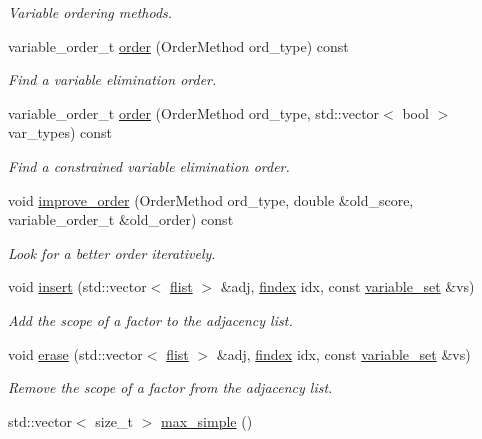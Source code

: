\begin{DoxyCompactItemize}
\begin{DoxyCompactList}\small\item\em Variable ordering methods. \end{DoxyCompactList}\item 
variable\+\_\+order\+\_\+t \hyperlink{classmerlin_1_1graphical__model_a90bcf3fb02f0f43bf57520e834875c78}{order} (Order\+Method ord\+\_\+type) const 
\begin{DoxyCompactList}\small\item\em Find a variable elimination order. \end{DoxyCompactList}\item 
variable\+\_\+order\+\_\+t \hyperlink{classmerlin_1_1graphical__model_a8a722099188b11d7e44b668c13e836f2}{order} (Order\+Method ord\+\_\+type, std\+::vector$<$ bool $>$ var\+\_\+types) const 
\begin{DoxyCompactList}\small\item\em Find a constrained variable elimination order. \end{DoxyCompactList}\item 
void \hyperlink{classmerlin_1_1graphical__model_a42f9b6f295100feefaaec09cef03c173}{improve\+\_\+order} (Order\+Method ord\+\_\+type, double \&old\+\_\+score, variable\+\_\+order\+\_\+t \&old\+\_\+order) const 
\begin{DoxyCompactList}\small\item\em Look for a better order iteratively. \end{DoxyCompactList}\item 
void \hyperlink{classmerlin_1_1graphical__model_aa953b05dcb91b18c8726324bcbe7eb24}{insert} (std\+::vector$<$ \hyperlink{classmerlin_1_1graphical__model_a615e25ec6594615fddfd4c3c4776b99f}{flist} $>$ \&adj, \hyperlink{classmerlin_1_1graphical__model_ab2b46f09d8142bb68f243ecadbdabb6b}{findex} idx, const \hyperlink{classmerlin_1_1variable__set}{variable\+\_\+set} \&vs)
\begin{DoxyCompactList}\small\item\em Add the scope of a factor to the adjacency list. \end{DoxyCompactList}\item 
void \hyperlink{classmerlin_1_1graphical__model_add6a62d0d4a2091944bf18ad108ff1ba}{erase} (std\+::vector$<$ \hyperlink{classmerlin_1_1graphical__model_a615e25ec6594615fddfd4c3c4776b99f}{flist} $>$ \&adj, \hyperlink{classmerlin_1_1graphical__model_ab2b46f09d8142bb68f243ecadbdabb6b}{findex} idx, const \hyperlink{classmerlin_1_1variable__set}{variable\+\_\+set} \&vs)
\begin{DoxyCompactList}\small\item\em Remove the scope of a factor from the adjacency list. \end{DoxyCompactList}\item 
\hypertarget{classmerlin_1_1graphical__model_ad1d7f268d7beb504a1e6ed79a1fca676}{}std\+::vector$<$ size\+\_\+t $>$ \hyperlink{classmerlin_1_1graphical__model_ad1d7f268d7beb504a1e6ed79a1fca676}{max\+\_\+simple} ()\label{classmerlin_1_1graphical__model_ad1d7f268d7beb504a1e6ed79a1fca676}


\end{DoxyCompactItemize}

